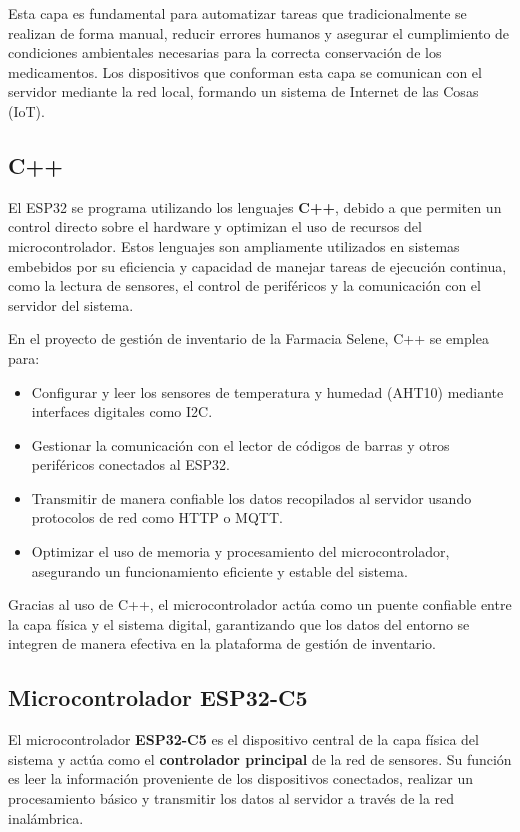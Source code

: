Esta capa es fundamental para automatizar tareas que tradicionalmente se realizan de forma manual, reducir errores humanos y asegurar el cumplimiento de condiciones ambientales necesarias para la correcta conservación de los medicamentos. Los dispositivos que conforman esta capa se comunican con el servidor mediante la red local, formando un sistema de Internet de las Cosas (IoT).

\subsection{C++}

El ESP32 se programa utilizando los lenguajes \textbf{C++}, debido a que permiten un control directo sobre el hardware y optimizan el uso de recursos del microcontrolador. Estos lenguajes son ampliamente utilizados en sistemas embebidos por su eficiencia y capacidad de manejar tareas de ejecución continua, como la lectura de sensores, el control de periféricos y la comunicación con el servidor del sistema.

En el proyecto de gestión de inventario de la Farmacia Selene, C++ se emplea para:

\begin{itemize}
\item Configurar y leer los sensores de temperatura y humedad (AHT10) mediante interfaces digitales como I2C.
\item Gestionar la comunicación con el lector de códigos de barras y otros periféricos conectados al ESP32.
\item Transmitir de manera confiable los datos recopilados al servidor usando protocolos de red como HTTP o MQTT.
\item Optimizar el uso de memoria y procesamiento del microcontrolador, asegurando un funcionamiento eficiente y estable del sistema.
\end{itemize}

Gracias al uso de C++, el microcontrolador actúa como un puente confiable entre la capa física y el sistema digital, garantizando que los datos del entorno se integren de manera efectiva en la plataforma de gestión de inventario.

\subsection{Microcontrolador ESP32-C5}

El microcontrolador \textbf{ESP32-C5} es el dispositivo central de la capa física del sistema y actúa como el \textbf{controlador principal} de la red de sensores. Su función es leer la información proveniente de los dispositivos conectados, realizar un procesamiento básico y transmitir los datos al servidor a través de la red inalámbrica.

